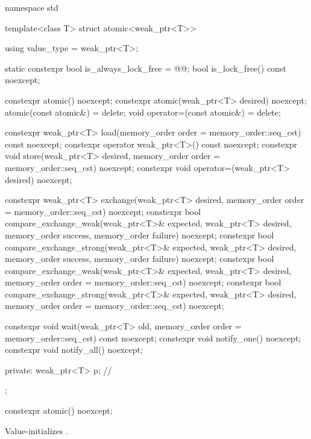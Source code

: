 %
\begin{codeblock}
namespace std {
  template<class T> struct atomic<weak_ptr<T>> {
    using value_type = weak_ptr<T>;

    static constexpr bool is_always_lock_free = @@;
    bool is_lock_free() const noexcept;

    constexpr atomic() noexcept;
    constexpr atomic(weak_ptr<T> desired) noexcept;
    atomic(const atomic&) = delete;
    void operator=(const atomic&) = delete;

    constexpr weak_ptr<T> load(memory_order order = memory_order::seq_cst) const noexcept;
    constexpr operator weak_ptr<T>() const noexcept;
    constexpr void store(weak_ptr<T> desired,
                         memory_order order = memory_order::seq_cst) noexcept;
    constexpr void operator=(weak_ptr<T> desired) noexcept;

    constexpr weak_ptr<T> exchange(weak_ptr<T> desired,
                                   memory_order order = memory_order::seq_cst) noexcept;
    constexpr bool compare_exchange_weak(weak_ptr<T>& expected, weak_ptr<T> desired,
                                         memory_order success, memory_order failure) noexcept;
    constexpr bool compare_exchange_strong(weak_ptr<T>& expected, weak_ptr<T> desired,
                                           memory_order success, memory_order failure) noexcept;
    constexpr bool compare_exchange_weak(weak_ptr<T>& expected, weak_ptr<T> desired,
                                         memory_order order = memory_order::seq_cst) noexcept;
    constexpr bool compare_exchange_strong(weak_ptr<T>& expected, weak_ptr<T> desired,
                                           memory_order order = memory_order::seq_cst) noexcept;

    constexpr void wait(weak_ptr<T> old,
                        memory_order order = memory_order::seq_cst) const noexcept;
    constexpr void notify_one() noexcept;
    constexpr void notify_all() noexcept;

  private:
    weak_ptr<T> p;              // \expos
  };
}
\end{codeblock}

%
\begin{itemdecl}
constexpr atomic() noexcept;
\end{itemdecl}

\begin{itemdescr}
\pnum
\effects
Value-initializes .
\end{itemdescr}

